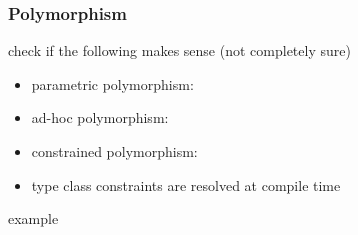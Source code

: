 \documentclass[a4paper,landscape,10pt]{article}
\begin{document}
\begin{multicols*}{2}
  \subsubsection{Polymorphism}

  \todo check if the following makes sense (not completely sure)

  \begin{itemize}
    \item parametric polymorphism: 
    \item ad-hoc polymorphism: 
    \item constrained polymorphism: 
    \item type class constraints are resolved at compile time
  \end{itemize}

  \missing example

\end{multicols*}

\clearpage
\end{document}
